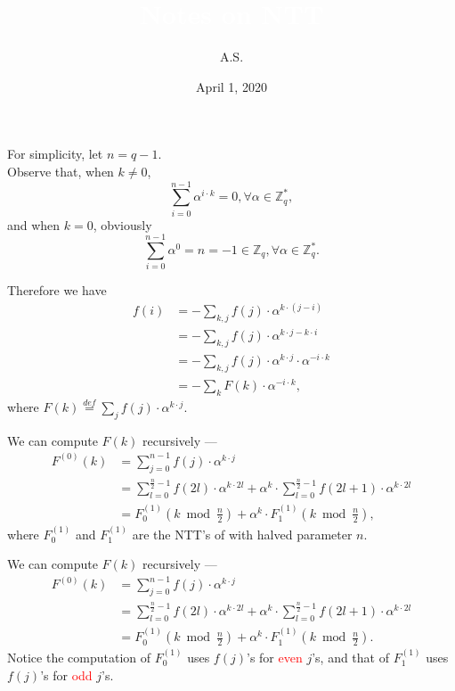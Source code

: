 \documentclass{beamer}	%
\title{\textcolor{white}{Notes on NTT}}
\subtitle{\textcolor{white}{}}
\author{A.S.}
\date{April 1, 2020}
\newcommand{\Z}{\mathbb{Z}}
\theoremstyle{plain}
\theoremstyle{definition}
\theoremstyle{remark}
\numberwithin{equation}{section}
\begin{document}
\begin{frame}
For simplicity, let $n = q - 1$.\\
Observe that, when $k \ne 0$, 
\[
\sum_{i=0}^{n-1}\alpha^{i \cdot k} = 0, \forall \alpha \in \Z_q^*,
\]
and when $k = 0$, obviously
\[
\sum_{i=0}^{n-1}\alpha^0 = n = -1 \in \mathbb{Z}_q, \forall \alpha \in \Z_q^*.
\]
\end{frame}

\begin{frame}
Therefore we have
\begin{align*}
f(i) & = -\sum_{k,j}{f(j) \cdot \alpha^{k \cdot (j-i)}} \\
     & = -\sum_{k,j}{f(j) \cdot \alpha^{k \cdot j - k \cdot i}} \\
     & = -\sum_{k,j}{f(j) \cdot \alpha^{k \cdot j} \cdot \alpha^{-i \cdot k}} \\
     & = -\sum_k{F(k) \cdot \alpha^{-i \cdot k}},
\end{align*}
where $F(k) \overset{def}{=} \sum_{j}{f(j) \cdot \alpha^{k \cdot j}}$.
\end{frame}

\begin{frame}
We can compute $F(k)$ recursively ---
\begin{align*}
F^{(0)}(k) &= \sum_{j=0}^{n-1}{f(j) \cdot \alpha^{k \cdot j}} \\
           &= \sum_{l=0}^{\frac{n}{2}-1}{f(2l) \cdot \alpha^{k \cdot 2l}} + \alpha^{k} \cdot \sum_{l=0}^{\frac{n}{2}-1}{f(2l+1) \cdot \alpha^{k \cdot 2l}} \\
           &= F^{(1)}_0(k \bmod \frac{n}{2}) + \alpha^{k} \cdot F^{(1)}_1(k \bmod \frac{n}{2}),
\end{align*}
where $F^{(1)}_0$ and $F^{(1)}_1$ are the NTT's of with halved parameter $n$.

\end{frame}

\begin{frame}
We can compute $F(k)$ recursively ---
\begin{align*}
F^{(0)}(k) &= \sum_{j=0}^{n-1}{f(j) \cdot \alpha^{k \cdot j}} \\
&= \sum_{l=0}^{\frac{n}{2}-1}{f(2l) \cdot \alpha^{k \cdot 2l}} + \alpha^{k} \cdot \sum_{l=0}^{\frac{n}{2}-1}{f(2l+1) \cdot \alpha^{k \cdot 2l}} \\
&= F^{(1)}_0(k \bmod \frac{n}{2}) + \alpha^{k} \cdot F^{(1)}_1(k \bmod \frac{n}{2}).
\end{align*}
Notice the computation of $F^{(1)}_0$ uses $f(j)$'s for \textcolor{red}{even} $j$'s, and that of $F^{(1)}_1$ uses $f(j)$'s for \textcolor{red}{odd} $j$'s.

\end{frame}
\end{document}
